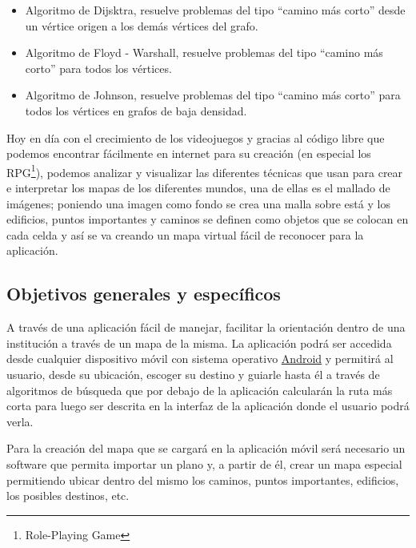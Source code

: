 \documentclass[letterpaper,11pt]{article}
\begin{document}
	\begin{itemize}
		\item Algoritmo de Dijsktra, resuelve problemas del tipo ``camino 
		más corto'' desde un vértice origen a los demás vértices del 
		grafo.

		\item Algoritmo de Floyd - Warshall, resuelve problemas del tipo 
		``camino más corto'' para todos los vértices.

		\item Algoritmo de Johnson, resuelve problemas del tipo ``camino 
		más corto'' para todos los vértices en grafos de baja densidad.

	\end{itemize}

    Hoy en día con el crecimiento de los videojuegos y gracias al código libre 
    que podemos encontrar fácilmente en internet para su creación (en 
    especial los RPG\footnote{Role-Playing Game}), podemos analizar y 
    visualizar las diferentes técnicas que usan para crear e 
    interpretar los mapas de los diferentes mundos, una de ellas es el 
    mallado de imágenes; poniendo una imagen como fondo se crea una 
    malla sobre está y los edificios, puntos importantes y caminos se 
    definen como objetos que se colocan en cada celda y así se va 
    creando un mapa virtual fácil de reconocer para la aplicación. 
	
	\subsection{Objetivos generales y específicos}
	
	A través de una aplicación fácil de manejar, facilitar la 
	orientación	dentro de una institución a través de un mapa de la 
	misma. La aplicación podrá ser accedida desde cualquier dispositivo 
	móvil con sistema operativo 
	\href{http://www.android.com/about/}{Android} y permitirá al 
	usuario, desde su 
	ubicación, escoger su destino y guiarle hasta él a través de
	algoritmos de búsqueda que por debajo de la aplicación calcularán la 
	ruta más corta para luego ser descrita en la interfaz de la 
	aplicación donde el usuario podrá verla.

	Para la creación del mapa que se cargará en la aplicación móvil será 
	necesario un software que permita importar un plano y, a partir de él, crear un mapa
	especial permitiendo ubicar dentro del mismo
	los caminos, puntos importantes, edificios, los posibles destinos, 
	etc.
	
\end{document}
